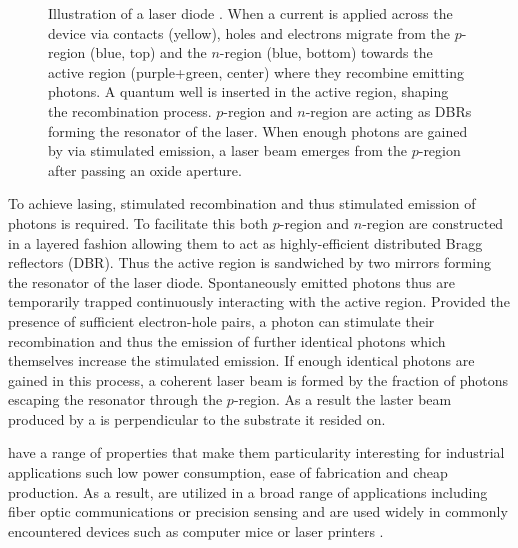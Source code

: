 		\begin{figure}[htp]
			\centering
			\caption[Sketch of a \vcsel]{Illustration of a \VCSEL laser diode \cite{ihfg2009}. When a current is applied across the device via contacts (yellow), holes and electrons migrate from the $p$-region (blue, top) and the $n$-region (blue, bottom) towards the active region (purple+green, center) where they recombine emitting photons. A quantum well is inserted in the active region, shaping the recombination process. $p$-region and $n$-region are acting as DBRs forming the resonator of the laser. When enough photons are gained by via stimulated emission, a laser beam emerges from the $p$-region after passing an oxide aperture.}
			\label{fig::vcsel_sketch}
		\end{figure}

		To achieve lasing, stimulated recombination and thus stimulated emission of photons is required. To facilitate this both $p$-region and $n$-region are constructed in a layered fashion allowing them to act as highly-efficient distributed Bragg reflectors (DBR). Thus the active region is sandwiched by two mirrors forming the resonator of the laser diode. Spontaneously emitted photons thus are temporarily trapped continuously interacting with the active region. Provided the presence of sufficient electron-hole pairs, a photon can stimulate their recombination and thus the emission of further identical photons which themselves increase the stimulated emission. If enough identical photons are gained in this process, a coherent laser beam is formed by the fraction of photons escaping the resonator through the $p$-region. As a result the laster beam produced by a \VCSEL is perpendicular to the substrate it resided on.

		\VCSELs have a range of properties that make them particularity interesting for industrial applications such low power consumption, ease of fabrication and cheap production. As a result, \VCSELs are utilized in a broad range of applications including fiber optic communications or precision sensing and are used widely in commonly encountered devices such as computer mice or laser printers \cite{ihfg2009}.

